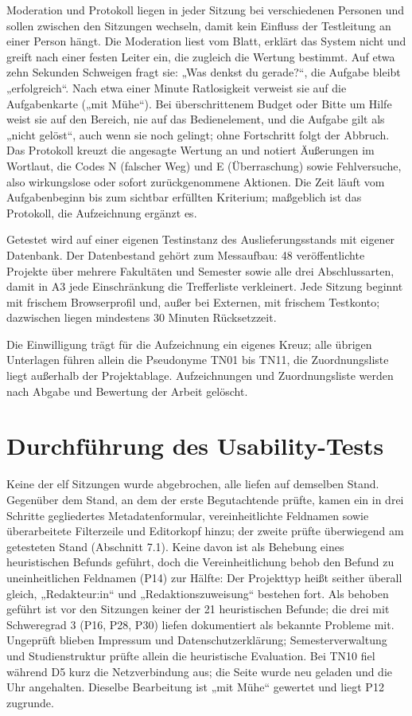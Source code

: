 Moderation und Protokoll liegen in jeder Sitzung bei verschiedenen Personen und sollen zwischen den Sitzungen wechseln, damit kein Einfluss der Testleitung an einer Person hängt. Die Moderation liest vom Blatt, erklärt das System nicht und greift nach einer festen Leiter ein, die zugleich die Wertung bestimmt. Auf etwa zehn Sekunden Schweigen fragt sie: „Was denkst du gerade?“, die Aufgabe bleibt „erfolgreich“. Nach etwa einer Minute Ratlosigkeit verweist sie auf die Aufgabenkarte („mit Mühe“). Bei überschrittenem Budget oder Bitte um Hilfe weist sie auf den Bereich, nie auf das Bedienelement, und die Aufgabe gilt als „nicht gelöst“, auch wenn sie noch gelingt; ohne Fortschritt folgt der Abbruch. Das Protokoll kreuzt die angesagte Wertung an und notiert Äußerungen im Wortlaut, die Codes N (falscher Weg) und E (Überraschung) sowie Fehlversuche, also wirkungslose oder sofort zurückgenommene Aktionen. Die Zeit läuft vom Aufgabenbeginn bis zum sichtbar erfüllten Kriterium; maßgeblich ist das Protokoll, die Aufzeichnung ergänzt es.

Getestet wird auf einer eigenen Testinstanz des Auslieferungsstands mit eigener Datenbank. Der Datenbestand gehört zum Messaufbau: 48 veröffentlichte Projekte über mehrere Fakultäten und Semester sowie alle drei Abschlussarten, damit in A3 jede Einschränkung die Trefferliste verkleinert. Jede Sitzung beginnt mit frischem Browserprofil und, außer bei Externen, mit frischem Testkonto; dazwischen liegen mindestens 30 Minuten Rücksetzzeit.

Die Einwilligung trägt für die Aufzeichnung ein eigenes Kreuz; alle übrigen Unterlagen führen allein die Pseudonyme TN01 bis TN11, die Zuordnungsliste liegt außerhalb der Projektablage. Aufzeichnungen und Zuordnungsliste werden nach Abgabe und Bewertung der Arbeit gelöscht.

\section{Durchführung des Usability-Tests}
\label{sec:durchfuehrung}

Keine der elf Sitzungen wurde abgebrochen, alle liefen auf demselben Stand. Gegenüber dem Stand, an dem der erste Begutachtende prüfte, kamen ein in drei Schritte gegliedertes Metadatenformular, vereinheitlichte Feldnamen sowie überarbeitete Filterzeile und Editorkopf hinzu; der zweite prüfte überwiegend am getesteten Stand (Abschnitt 7.1). Keine davon ist als Behebung eines heuristischen Befunds geführt, doch die Vereinheitlichung behob den Befund zu uneinheitlichen Feldnamen (P14) zur Hälfte: Der Projekttyp heißt seither überall gleich, „Redakteur:in“ und „Redaktionszuweisung“ bestehen fort. Als behoben geführt ist vor den Sitzungen keiner der 21 heuristischen Befunde; die drei mit Schweregrad 3 (P16, P28, P30) liefen dokumentiert als bekannte Probleme mit. Ungeprüft blieben Impressum und Datenschutzerklärung; Semesterverwaltung und Studienstruktur prüfte allein die heuristische Evaluation. Bei TN10 fiel während D5 kurz die Netzverbindung aus; die Seite wurde neu geladen und die Uhr angehalten. Dieselbe Bearbeitung ist „mit Mühe“ gewertet und liegt P12 zugrunde.

